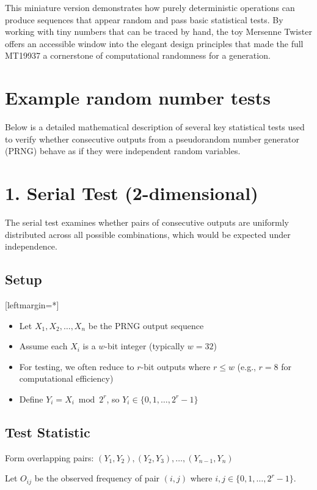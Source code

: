 \documentclass[12pt]{article}
\begin{document}
This miniature version demonstrates how purely deterministic operations can produce sequences that appear random and pass basic statistical tests. By working with tiny numbers that can be traced by hand, the toy Mersenne Twister offers an accessible window into the elegant design principles that made the full MT19937 a cornerstone of computational randomness for a generation.

\section*{Example random number tests}

Below is a detailed mathematical description of several key statistical tests used to verify whether consecutive outputs from a pseudorandom number generator (PRNG) behave as if they were independent random variables.

\section*{1. Serial Test (2-dimensional)}

The serial test examines whether pairs of consecutive outputs are uniformly distributed across all possible combinations, which would be expected under independence.

\subsection*{Setup}
[leftmargin=*]\begin{itemize}
    \item Let $X_1, X_2, \dots, X_n$ be the PRNG output sequence
    \item Assume each $X_i$ is a $w$-bit integer (typically $w = 32$)
    \item For testing, we often reduce to $r$-bit outputs where $r \leq w$ (e.g., $r = 8$ for computational efficiency)
    \item Define $Y_i = X_i \bmod 2^r$, so $Y_i \in \{0, 1, \dots, 2^r - 1\}$
\end{itemize}
\subsection*{Test Statistic}
Form overlapping pairs: $(Y_1, Y_2), (Y_2, Y_3), \dots, (Y_{n-1}, Y_n)$

Let $O_{ij}$ be the observed frequency of pair $(i, j)$ where $i, j \in \{0, 1, \dots, 2^r - 1\}$.
\end{document}

